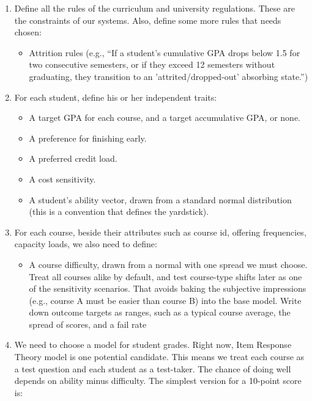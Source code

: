 \documentclass[10pt,a4paper]{article}
\begin{document}
\begin{enumerate}
    \item Define all the rules of the curriculum and university regulations. These are the constraints of our systems. Also, define some more rules that needs chosen:
    \begin{itemize}
        \item Attrition rules (e.g., ``If a student’s cumulative GPA drops below 1.5 for two consecutive semesters, or if they exceed 12 semesters without graduating, they transition to an 'attrited/dropped-out' absorbing state.'')
    \end{itemize}
    \item For each student, define his or her independent traits:
    \begin{itemize}
        \item A target GPA for each course, and a target accumulative GPA, or none.
        \item A preference for finishing early.
        \item A preferred credit load.
        \item A cost sensitivity.
        \item A student's ability vector, drawn from a standard normal distribution (this is a convention that defines the yardstick).
    \end{itemize}
    \item For each course, beside their attributes such as course id, offering frequencies, capacity loads, we also need to define:
    \begin{itemize}
        \item A course difficulty, drawn from a normal with one spread we must choose. Treat all courses alike by default, and test course-type shifts later as one of the sensitivity scenarios. That avoids baking the subjective impressions (e.g., course A must be easier than course B) into the base model. Write down outcome targets as ranges, such as a typical course average, the spread of scores, and a fail rate
    \end{itemize}

    \item We need to choose a model for student grades. Right now, Item Response Theory model is one potential candidate. This means we treat each course as a test question and each student as a test-taker. The chance of doing well depends on ability minus difficulty. The simplest version for a 10-point score is:
    

\end{enumerate}
\end{document}
